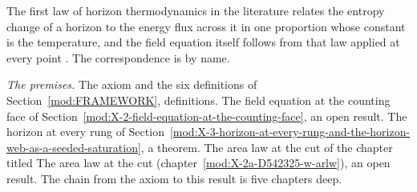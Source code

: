 \begin{chbridge}
The first law of horizon thermodynamics in the literature relates the entropy change of a horizon to the energy flux across it in one proportion whose constant is the temperature, and the field equation itself follows from that law applied at every point \cite{Bekenstein1973,Jacobson1995}. The correspondence is by name.
\end{chbridge}
\begin{chproof}
\textit{The premises.} The axiom and the six definitions of Section~\ref{mod:FRAMEWORK}, definitions. The field equation at the counting face of Section~\ref{mod:X-2-field-equation-at-the-counting-face}, an open result. The horizon at every rung of Section~\ref{mod:X-3-horizon-at-every-rung-and-the-horizon-web-as-a-seeded-saturation}, a theorem. The area law at the cut of the chapter titled The area law at the cut (chapter~\ref{mod:X-2a-D542325-w-arlw}), an open result. The chain from the axiom to this result is five chapters deep.


\end{chproof}
